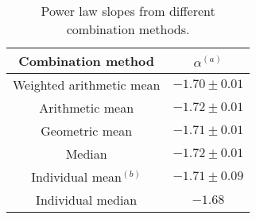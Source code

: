 \begin{table}
\centering
\begin{center}
\caption{Power law slopes from different combination methods.}
\begin{tabular}{cc}
\hline
\noalign{\smallskip}
Combination method &  $\alpha$$^{(a)}$ \\  
\hline


Weighted arithmetic mean  & $-1.70\pm 0.01$   \\
Arithmetic mean  & $-1.72\pm 0.01$   \\
Geometric mean  & $-1.71\pm 0.01$   \\
Median  & $-1.72\pm 0.01$   \\




Individual mean$^{(b)}$  & $-1.71\pm 0.09$   \\
Individual median & $-1.68$   \\


\hline
\hline
\end{tabular}
\end{center}


\end{table}



